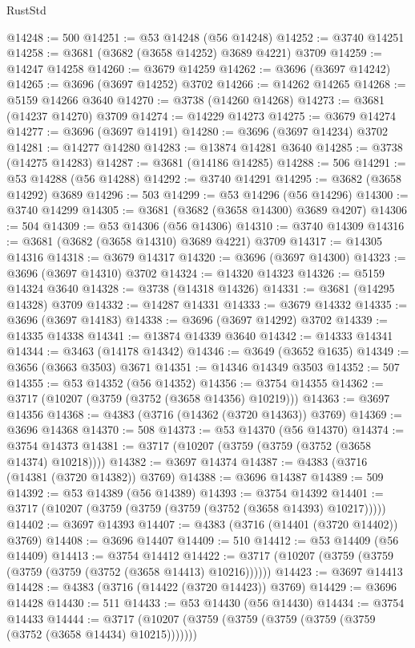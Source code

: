 \begin{lexlean}{RustStd}
\begin{coremodule}
@14248 := 500
@14251 := @53 @14248 (@56 @14248)
@14252 := @3740 @14251
@14258 := @3681 (@3682 (@3658 @14252) @3689 @4221) @3709
@14259 := @14247 @14258
@14260 := @3679 @14259
@14262 := @3696 (@3697 @14242)
@14265 := @3696 (@3697 @14252) @3702
@14266 := @14262 @14265
@14268 := @5159 @14266 @3640
@14270 := @3738 (@14260 @14268)
@14273 := @3681 (@14237 @14270) @3709
@14274 := @14229 @14273
@14275 := @3679 @14274
@14277 := @3696 (@3697 @14191)
@14280 := @3696 (@3697 @14234) @3702
@14281 := @14277 @14280
@14283 := @13874 @14281 @3640
@14285 := @3738 (@14275 @14283)
@14287 := @3681 (@14186 @14285)
@14288 := 506
@14291 := @53 @14288 (@56 @14288)
@14292 := @3740 @14291
@14295 := @3682 (@3658 @14292) @3689
@14296 := 503
@14299 := @53 @14296 (@56 @14296)
@14300 := @3740 @14299
@14305 := @3681 (@3682 (@3658 @14300) @3689 @4207)
@14306 := 504
@14309 := @53 @14306 (@56 @14306)
@14310 := @3740 @14309
@14316 := @3681 (@3682 (@3658 @14310) @3689 @4221) @3709
@14317 := @14305 @14316
@14318 := @3679 @14317
@14320 := @3696 (@3697 @14300)
@14323 := @3696 (@3697 @14310) @3702
@14324 := @14320 @14323
@14326 := @5159 @14324 @3640
@14328 := @3738 (@14318 @14326)
@14331 := @3681 (@14295 @14328) @3709
@14332 := @14287 @14331
@14333 := @3679 @14332
@14335 := @3696 (@3697 @14183)
@14338 := @3696 (@3697 @14292) @3702
@14339 := @14335 @14338
@14341 := @13874 @14339 @3640
@14342 := @14333 @14341
@14344 := @3463 (@14178 @14342)
@14346 := @3649 (@3652 @1635)
@14349 := @3656 (@3663 @3503) @3671
@14351 := @14346 @14349 @3503
@14352 := 507
@14355 := @53 @14352 (@56 @14352)
@14356 := @3754 @14355
@14362 := @3717 (@10207 (@3759 (@3752 (@3658 @14356) @10219)))
@14363 := @3697 @14356
@14368 := @4383 (@3716 (@14362 (@3720 @14363)) @3769)
@14369 := @3696 @14368
@14370 := 508
@14373 := @53 @14370 (@56 @14370)
@14374 := @3754 @14373
@14381 := @3717 (@10207 (@3759 (@3759 (@3752 (@3658 @14374) @10218))))
@14382 := @3697 @14374
@14387 := @4383 (@3716 (@14381 (@3720 @14382)) @3769)
@14388 := @3696 @14387
@14389 := 509
@14392 := @53 @14389 (@56 @14389)
@14393 := @3754 @14392
@14401 := @3717 (@10207 (@3759 (@3759 (@3759 (@3752 (@3658 @14393) @10217)))))
@14402 := @3697 @14393
@14407 := @4383 (@3716 (@14401 (@3720 @14402)) @3769)
@14408 := @3696 @14407
@14409 := 510
@14412 := @53 @14409 (@56 @14409)
@14413 := @3754 @14412
@14422 := @3717 (@10207 (@3759 (@3759 (@3759 (@3759 (@3752 (@3658 @14413) @10216))))))
@14423 := @3697 @14413
@14428 := @4383 (@3716 (@14422 (@3720 @14423)) @3769)
@14429 := @3696 @14428
@14430 := 511
@14433 := @53 @14430 (@56 @14430)
@14434 := @3754 @14433
@14444 := @3717 (@10207 (@3759 (@3759 (@3759 (@3759 (@3759 (@3752 (@3658 @14434) @10215)))))))

\end{coremodule}
\end{lexlean}
